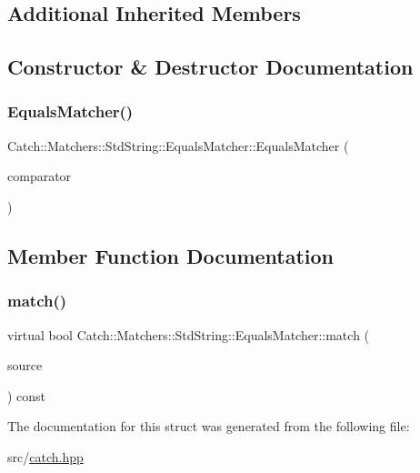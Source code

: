 \subsection*{Additional Inherited Members}


\subsection{Constructor \& Destructor Documentation}
\mbox{\label{struct_catch_1_1_matchers_1_1_std_string_1_1_equals_matcher_ab740f1fb2310e9fe3fed5134d4c7e4c8}} 
\subsubsection{\texorpdfstring{Equals\+Matcher()}{EqualsMatcher()}}
{\footnotesize\ttfamily Catch\+::\+Matchers\+::\+Std\+String\+::\+Equals\+Matcher\+::\+Equals\+Matcher (\begin{DoxyParamCaption}\item[{\hyperlink{struct_catch_1_1_matchers_1_1_std_string_1_1_cased_string}{Cased\+String} const \&}]{comparator }\end{DoxyParamCaption})}



\subsection{Member Function Documentation}
\mbox{\label{struct_catch_1_1_matchers_1_1_std_string_1_1_equals_matcher_a2aeaac3c0efb8422643cd1b155256213}} 
\subsubsection{\texorpdfstring{match()}{match()}}
{\footnotesize\ttfamily virtual bool Catch\+::\+Matchers\+::\+Std\+String\+::\+Equals\+Matcher\+::match (\begin{DoxyParamCaption}\item[{\textbf{ std\+::string} const \&}]{source }\end{DoxyParamCaption}) const\hspace{0.3cm}{\ttfamily [virtual]}}



The documentation for this struct was generated from the following file\+:\begin{DoxyCompactItemize}
\item 
src/\hyperlink{catch_8hpp}{catch.\+hpp}\end{DoxyCompactItemize}
